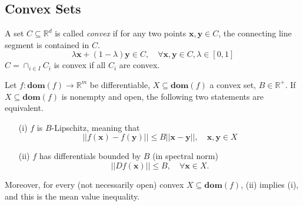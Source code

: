 \subsection{Convex Sets}
        A set $C \subseteq \mathbb{R}^d$ is called \textit{convex} if for any two points $\mathbf{x}, \mathbf{y} \in C$, the connecting line segment is contained in $C$.
        \begin{equation*}
            \lambda \mathbf{x} + (1 - \lambda) \mathbf{y} \in C, \quad \forall \mathbf{x}, \mathbf{y} \in C, \lambda \in [0, 1]
        \end{equation*}
        $C = \cap_{i\in I} C_i$ is convex if all $C_i$ are convex.
    
        Let $f: \mathbf{dom}(f) \rightarrow \mathbb{R}^m$ be differentiable, $X \subseteq \mathbf{dom}(f)$ a convex set, $B\in \mathbb{R}^+$.
        If $X \subseteq \mathbf{dom}(f)$ is nonempty and open, the following two statements are equivalent.

        \begin{itemize}
            \item[(i)] $f$ is $B$-Lipschitz, meaning that
            $$||f(\mathbf{x})-f(\mathbf{y})|| \leq B ||\mathbf{x}-\mathbf{y}||, \quad \mathbf{x}, \mathbf{y} \in X$$
            \item[(ii)] $f$ has differentials bounded by $B$ (in spectral norm)
            $$||Df(\mathbf{x})|| \leq B, \quad \forall \mathbf{x} \in X.$$
        \end{itemize}
        
        Moreover, for every (not necessarily open) convex $X \subseteq \mathbf{dom}(f)$, (ii) implies (i), and this is the mean value inequality.